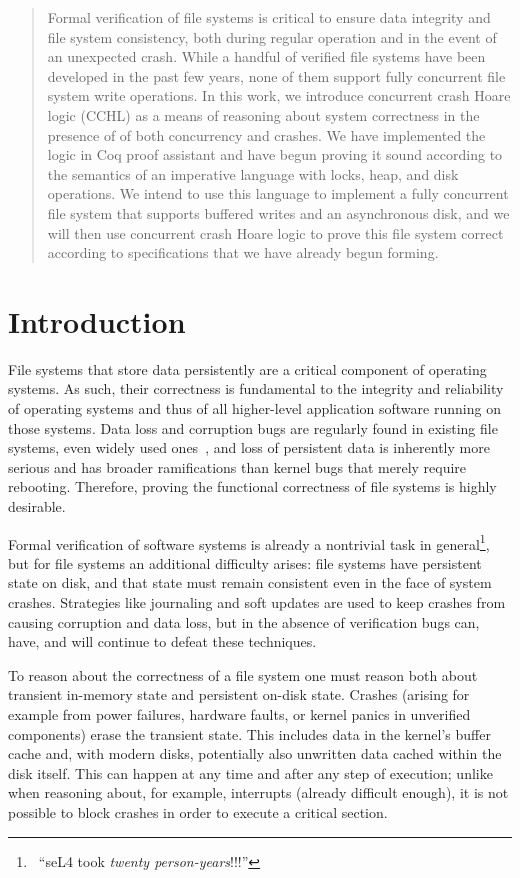 \begin{abstract}
Formal verification of file systems is critical to ensure data integrity and
file system consistency, both during regular operation and in the event of
an unexpected crash. While a handful of verified file systems have been
developed in the past few years, none of them support fully concurrent file
system write operations. In this work, we introduce concurrent crash Hoare
logic (CCHL) as a means of reasoning about system correctness in the presence of
of both concurrency and crashes. We have implemented the logic in Coq proof
assistant and have begun proving it sound according to the semantics of an
imperative language with locks, heap, and disk operations. We intend to use
this language to implement a fully concurrent file system that supports
buffered writes and an asynchronous disk, and we will then use concurrent
crash Hoare logic to prove this file system correct according to specifications
that we have already begun forming.
\end{abstract}

\section{Introduction}

File systems that store data persistently are a critical component of
operating systems.
As such, their correctness is fundamental to the integrity and
reliability of operating systems and thus of all higher-level
application software running on those systems.
Data loss and corruption bugs are regularly found in existing
file systems, even widely used ones~\cite{yang2006explode},
and loss of persistent data is inherently more serious and has broader
ramifications than kernel bugs that merely require rebooting.
Therefore, proving the functional correctness of file systems is
highly desirable.

Formal verification of software systems is already a
nontrivial task in general\footnote{\
``seL4 took
\textit{twenty person-years}!!!''},
but for file systems an additional difficulty arises:
file systems have persistent state on disk, and
that state must remain consistent even in the face of
system crashes.
Strategies like journaling and soft updates are used to keep crashes
from causing corruption and data loss, but in the absence of
verification bugs can, have, and will continue to defeat these
techniques.

To reason about the correctness of a file system one must reason both
about transient in-memory state and persistent on-disk state.
Crashes (arising for example from power failures, hardware faults, or
kernel panics in unverified components) erase the transient state.
This includes data in the kernel's buffer cache and, with modern
disks, potentially also unwritten data cached within the disk itself.
This can happen at any time and after any step of execution; unlike
when reasoning about, for example,
interrupts (already difficult enough), it is not possible to
block crashes in order to execute a critical section.

